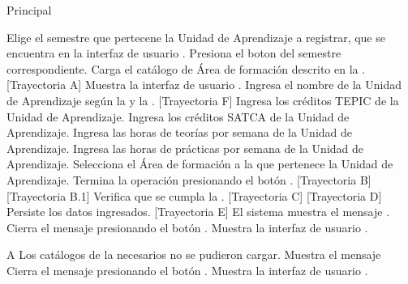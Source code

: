 \begin{UCtrayectoria}{Principal}
    
    \UCpaso[\UCactor] Elige el semestre que pertecene la Unidad de Aprendizaje a registrar, que se encuentra en la interfaz de usuario .
    \UCpaso[\UCactor] Presiona el boton \IUbutton{+} del semestre correspondiente.
    \UCpaso Carga el catálogo de Área de formación descrito en la .[Trayectoria A]
    \UCpaso Muestra la interfaz de usuario .
    \UCpaso[\UCactor] Ingresa el nombre de la Unidad de Aprendizaje según la  y la . [Trayectoria F]  
    \UCpaso[\UCactor] Ingresa los créditos TEPIC de la Unidad de Aprendizaje.
    \UCpaso[\UCactor] Ingresa los créditos SATCA de la Unidad de Aprendizaje.
    \UCpaso[\UCactor] Ingresa las horas de teorías por semana de la Unidad de Aprendizaje.
    \UCpaso[\UCactor] Ingresa las horas de prácticas por semana de la Unidad de Aprendizaje.
    \UCpaso[\UCactor] Selecciona el Área de formación a la que pertenece la Unidad de Aprendizaje.
    \UCpaso[\UCactor] Termina la operación presionando el botón . [Trayectoria B] [Trayectoria B.1]
    \UCpaso Verifica que se cumpla la . [Trayectoria C] [Trayectoria D] 
    \UCpaso Persiste los datos ingresados. [Trayectoria E]
    \UCpaso El sistema muestra el mensaje .
    \UCpaso[\UCactor] Cierra el mensaje presionando el botón .
    \UCpaso Muestra la interfaz de usuario  .
\end{UCtrayectoria}
    
    
    \begin{UCtrayectoriaA}{A}{ Los catálogos de la  necesarios no se pudieron cargar.}
    	\UCpaso Muestra el mensaje 
    	\UCpaso[\UCactor] Cierra el mensaje presionando el botón .
    	\UCpaso Muestra la interfaz de usuario .
    \end{UCtrayectoriaA}
    
